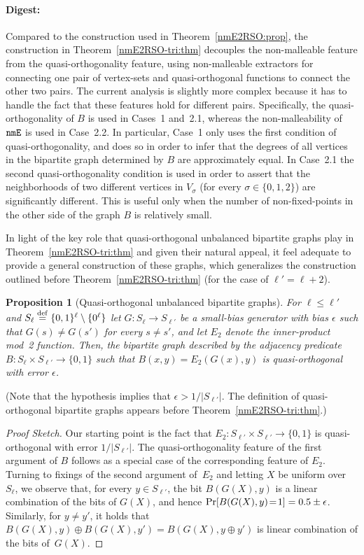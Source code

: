 \documentclass[10pt,a4paper]{article}
\newtheorem{proposition}[theorem]{Proposition}
\theoremstyle{definition}
\newcommand{\prob}{{\rm Pr}}
\newcommand{\e}{\epsilon}
\newcommand{\bitset}{\{0,1\}}
\newcommand{\xor}{\oplus}
\newcommand{\eqdef}{\stackrel{\rm def}{=}}
\newcommand{\BP}{\begin{proposition}}   \newcommand{\EP}{\end{proposition}}
\newcommand{\BPFS}{\begin{proof}[Proof Sketch]} \newcommand{\EPFS}{\end{proof}}
\newcommand{\nmE}{{\tt nmE}}
\begin{document}
\paragraph{Digest:}
Compared to the construction used in Theorem~\ref{nmE2RSO:prop},
the construction in Theorem~\ref{nmE2RSO-tri:thm} decouples
the non-malleable feature from the quasi-orthogonality feature,
using non-malleable extractors for connecting one pair of vertex-sets
and quasi-orthogonal functions to connect the other two pairs.
The current analysis is slightly more complex because it has
to handle the fact that these features hold for different pairs.
Specifically, the quasi-orthogonality of $B$ is used in Cases~1 and~2.1,
whereas the non-malleability of $\nmE$ is used in Case~2.2.
In particular, Case~1 only uses the first condition of quasi-orthogonality,
and does so in order to infer that the degrees of all vertices
in the bipartite graph determined by $B$ are approximately equal.
In Case~2.1 the second quasi-orthogonality condition is used
in order to assert that the neighborhoods of two different vertices
in $V_\sigma$ (for every $\sigma\in\{0,1,2\}$) are significantly different.
This is useful only when the number of non-fixed-points
in the other side of the graph $B$ is relatively small.
%
%
%
%

In light of the key role that quasi-orthogonal unbalanced bipartite
graphs play in Theorem~\ref{nmE2RSO-tri:thm} and given their natural appeal,
it feel adequate to provide a general construction of these graphs,
which generalizes the construction outlined before
Theorem~\ref{nmE2RSO-tri:thm} (for the case of $\ell'=\ell+2$).
%
%
%
%


\BP[Quasi-orthogonal unbalanced bipartite graphs]
\label{nice-bipartite:prop}
For $\ell\leq\ell'$ and $S_\ell\eqdef\bitset^\ell\setminus\{0^\ell\}$
let $G:S_\ell\to S_{\ell'}$ be a small-bias generator with bias $\e$
such that $G(s)\neq G(s')$ for every $s\neq s'$,
and let $E_2$ denote the inner-product mod~2 function.
Then, the bipartite graph described by
the adjacency predicate $B:S_\ell\times S_{\ell'}\to\bitset$
such that $B(x,y)=E_2(G(x),y)$ is quasi-orthogonal
with error $\e$.
%
\EP
(Note that the hypothesis implies that $\e>1/|S_{\ell'}|$.
The definition of quasi-orthogonal bipartite graphs
appears before Theorem~\ref{nmE2RSO-tri:thm}.)
\medskip

\BPFS
Our starting point is the fact
that $E_2:S_{\ell'}\times S_{\ell'}\to\bitset$
is quasi-orthogonal with error $1/|S_{\ell'}|$.
The quasi-orthogonality feature of the first argument of $B$
follows as a special case of the corresponding feature of $E_2$.
Turning to fixings of the second argument of~$E_2$
and letting $X$ be uniform over $S_\ell$,
we observe that, for every $y\in S_{\ell'}$,
the bit $B(G(X),y)$ is a linear combination of the bits of $G(X)$,
and hence $\prob[B(G(X),y)\!=\!1]=0.5\pm\e$.
Similarly, for $y\neq y'$, it holds
that $B(G(X),y)\xor B(G(X),y')=B(G(X),y\xor y')$
is linear combination of the bits of~$G(X)$.
\EPFS
\end{document}
